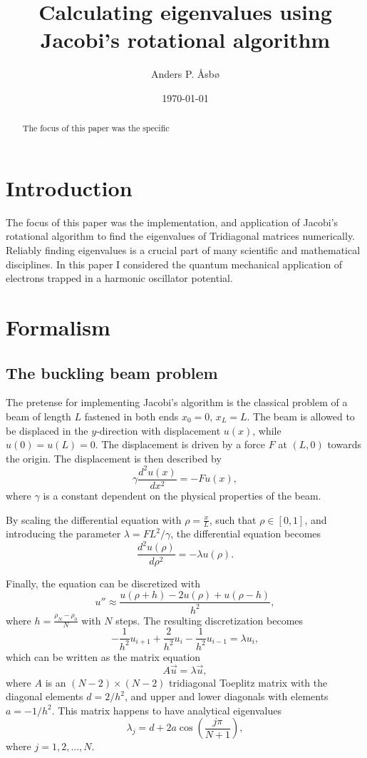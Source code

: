 \documentclass[english,notitlepage,reprint]{revtex4-1}  %
\begin{document}
\title{Calculating eigenvalues using Jacobi's rotational algorithm}   %
\author{Anders P. Åsbø}               %
\date{\today}
\noaffiliation                            %

\begin{abstract}
The focus of this paper was the specific
\end{abstract}

\maketitle
\tableofcontents

\section{Introduction}\label{sec:1}
The focus of this paper was the implementation, and application of Jacobi's rotational algorithm to find the eigenvalues of Tridiagonal matrices numerically. Reliably finding eigenvalues is a crucial part of many scientific and mathematical disciplines. In this paper I considered the quantum mechanical application of electrons trapped in a harmonic oscillator potential.

\section{Formalism}\label{sec:2}
\subsection{The buckling beam problem}\label{subsec:21}
The pretense for implementing Jacobi's algorithm is the classical problem of a beam of length \(L\) fastened in both ends \(x_{0} = 0\), \(x_{L} = L\). The beam is allowed to be displaced in the \(y\)-direction with displacement \(u(x)\), while \(u(0)=u(L)=0\). The displacement is driven by a force \(F\) at \((L,0)\) towards the origin. The displacement is then described by
$$
	\gamma \frac{d^{2}u(x)}{dx^{2}}=-Fu(x),
$$
where \(\gamma\) is a constant dependent on the physical properties of the beam\citep{DepartmentofPhysics2019}.

By scaling the differential equation with \(\rho = \frac{x}{L}\), such that \(\rho \in [0,1]\), and introducing the parameter \(\lambda = FL^{2}/\gamma\)\citep{DepartmentofPhysics2019}, the differential equation becomes
$$
	\frac{d^{2}u(\rho)}{d\rho^{2}}=-\lambda u(\rho).
$$

Finally, the equation can be discretized with
$$
	u'' \approx \frac{u(\rho+h)-2u(\rho)+u(\rho-h)}{h^{2}},
$$
where \(h = \frac{\rho_{N}-\rho_{0}}{N}\) with \(N\) steps\citep{DepartmentofPhysics2019}. The resulting discretization becomes
$$
	-\frac{1}{h^{2}}u_{i+1}+
	\frac{2}{h^{2}}u_{i}-\frac{1}{h^{2}}u_{i-1}=\lambda u_{i},
$$
which can be written as the matrix equation
$$
	A\vec{u}=\lambda\vec{u},
$$
where \(A\) is an \((N-2)\times (N-2)\) tridiagonal Toeplitz matrix with the diagonal elements \(d=2/h^{2}\), and upper and lower diagonals with elements \(a=-1/h^{2}\). This matrix happens to have analytical eigenvalues
$$
	\lambda_{j}=d+2a\cos\left(\frac{j\pi}{N+1}\right),
$$
where \(j=1,2,...,N\)\citep{DepartmentofPhysics2019}.
\end{document}
